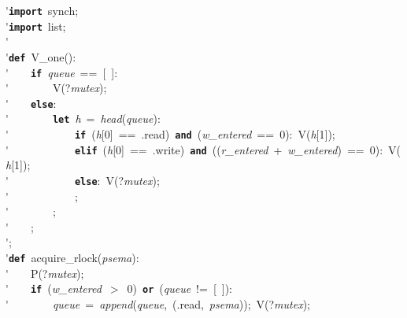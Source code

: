 \'\>\texttt{\textbf{import}}~synch;\\

\'\>\texttt{\textbf{import}}~list;\\

\'\>\\

\'\>\texttt{\textbf{def}}~V\_one():\\

\'\>~~~~\texttt{\textbf{if}}~\textit{queue}~==~[~]:\\

\'\>~~~~~~~~V(?\textit{mutex});\\

\'\>~~~~\texttt{\textbf{else}}:\\

\'\>~~~~~~~~\texttt{\textbf{let}}~\textit{h}~=~\textit{head}(\textit{queue}):\\

\'\>~~~~~~~~~~~~\texttt{\textbf{if}}~(\textit{h}[0]~==~.read)~\texttt{\textbf{and}}~(\textit{w\_entered}~==~0):~V(\textit{h}[1]);\\

\'\>~~~~~~~~~~~~\texttt{\textbf{elif}}~(\textit{h}[0]~==~.write)~\texttt{\textbf{and}}~((\textit{r\_entered}~+~\textit{w\_entered})~==~0):~V(\textit{h}[1]);\\

\'\>~~~~~~~~~~~~\texttt{\textbf{else}}:~V(?\textit{mutex});\\

\'\>~~~~~~~~~~~~;\\

\'\>~~~~~~~~;\\

\'\>~~~~;\\

\'\>;\\

\'\>\texttt{\textbf{def}}~acquire\_rlock(\textit{psema}):\\

\'\>~~~~P(?\textit{mutex});\\

\'\>~~~~\texttt{\textbf{if}}~(\textit{w\_entered}~$>$~0)~\texttt{\textbf{or}}~(\textit{queue}~!=~[~]):\\

\'\>~~~~~~~~\textit{queue}~=~\textit{append}(\textit{queue},~(.read,~\textit{psema}));~V(?\textit{mutex});\\

